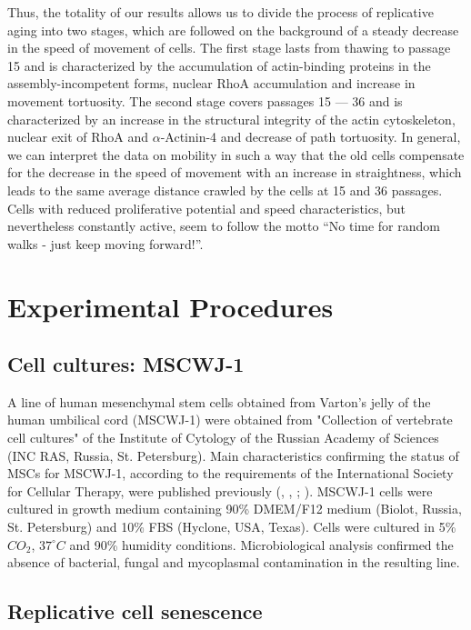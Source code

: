 \documentclass[alpha-refs]{wiley-article}
\begin{document}
Thus, the totality of our results allows us to divide the process of replicative aging into two stages, which are followed on the background of a steady decrease in the speed of movement of cells.
The first stage lasts from thawing to passage 15 and is characterized by the accumulation of actin-binding proteins in the assembly-incompetent forms, nuclear RhoA accumulation and increase in movement tortuosity.
The second stage covers passages 15 --- 36 and is characterized by an increase in the structural integrity of the actin cytoskeleton, nuclear exit of RhoA and $\alpha$-Actinin-4 and decrease of path tortuosity.
In general, we can interpret the data on mobility in such a way that the old cells compensate for the decrease in the speed of movement with an increase in straightness, which leads to the same average distance crawled by the cells at 15 and 36 passages.
Cells with reduced proliferative potential and speed characteristics, but nevertheless constantly active, seem to follow the motto “No time for random walks - just keep moving forward!”.

\section{Experimental Procedures}

\subsection{Cell cultures: MSCWJ-1}

A line of human mesenchymal stem cells obtained from Varton's jelly of the human umbilical cord (MSCWJ-1) were obtained from "Collection of vertebrate cell cultures" of the Institute of Cytology of the Russian Academy of Sciences (INC RAS, Russia, St. Petersburg).
Main characteristics confirming the status of MSCs for MSCWJ-1, according to the requirements of the International Society for Cellular Therapy, were published previously (\cite{krylova2017derivation}, \cite{koltsova2018dynamics}, \cite{dominici2006minimal}; \cite{sensebe2010mesenchymal}).
MSCWJ-1 cells were cultured in growth medium containing 90\% DMEM/F12 medium (Biolot, Russia, St. Petersburg) and 10\% FBS (Hyclone, USA, Texas).
Cells were cultured in 5\% $CO_2$, $37^{\circ}  C$ and 90\% humidity conditions.
Microbiological analysis confirmed the absence of bacterial, fungal and mycoplasmal contamination in the resulting line.

\subsection{Replicative cell senescence}
\end{document}
